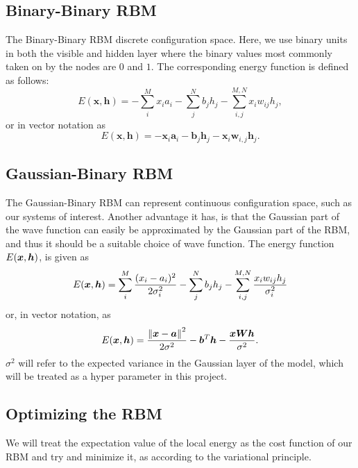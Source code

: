 \subsection{Binary-Binary RBM}
The Binary-Binary RBM discrete configuration space. Here, we use binary units in both the visible and hidden layer where the binary values most commonly taken on by the nodes are $0$ and $1$. The corresponding energy function is defined as follows:
\begin{equation*}
	E(\mathbf{x}, \mathbf{h}) = - \sum_i^M x_i a_i- \sum_j^N b_j h_j - \sum_{i,j}^{M,N} x_i w_{ij} h_j,
\label{_auto3}
\end{equation*}
or in vector notation as
\begin{equation*}
    E(\mathbf{x}, \mathbf{h}) = - \mathbf{x}_i \mathbf{a}_i - \mathbf{b}_j \mathbf{h}_j - \mathbf{x}_i \mathbf{w}_{i,j} \mathbf{h}_j.
\end{equation*}
\subsection{Gaussian-Binary RBM}
The Gaussian-Binary RBM can represent continuous configuration space, such as our systems of interest. Another advantage it has, is that the Gaussian part of the wave function can easily be approximated by the Gaussian part of the RBM, and thus it should be a suitable choice of wave function. The energy function $E\qty(\bm{x}, \bm{h})$, is given as 
\begin{equation*}
    E\qty(\bm{x}, \bm{h}) = \sum_i^M \frac{(x_i - a_i)^2}{2\sigma_i^2} - \sum_j^N b_j h_j - \sum_{i,j}^{M,N} \frac{x_i w_{ij} h_j}{\sigma_i^2} 
\end{equation*}
or, in vector notation, as 
\begin{equation}\label{eq:energy_function_RBM}
    E\qty(\bm{x}, \bm{h}) = \frac{\norm{\bm{x}-\bm{a}}^2}{2\sigma^2} - \bm{b}^T\bm{h} - \frac{\bm{x}\bm{W}\bm{h}}{\sigma^2}. 
\end{equation}
$\sigma^2$ will refer to the expected variance in the Gaussian layer of the model, which will be treated as a hyper parameter in this project. 

\subsection{Optimizing the RBM}
We will treat the expectation value of the local energy as the cost function of our RBM and try and minimize it, as according to the variational principle. 

